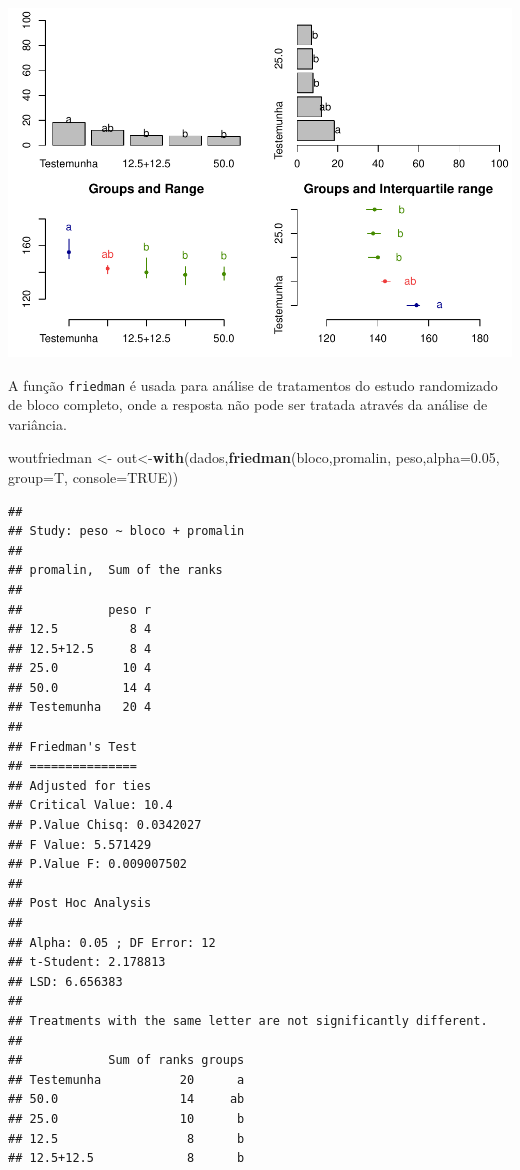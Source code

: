 \documentclass[
]{book}
\newenvironment{Shaded}{\begin{snugshade}}{\end{snugshade}}
\newcommand{\DataTypeTok}[1]{\textcolor[rgb]{0.13,0.29,0.53}{#1}}
\newcommand{\FloatTok}[1]{\textcolor[rgb]{0.00,0.00,0.81}{#1}}
\newcommand{\KeywordTok}[1]{\textcolor[rgb]{0.13,0.29,0.53}{\textbf{#1}}}
\newcommand{\NormalTok}[1]{#1}
\newcommand{\OtherTok}[1]{\textcolor[rgb]{0.56,0.35,0.01}{#1}}
\newcommand{\StringTok}[1]{\textcolor[rgb]{0.31,0.60,0.02}{#1}}
\begin{document}
\includegraphics{TudodoR_files/figure-latex/unnamed-chunk-306-1.pdf}

A função \texttt{friedman} é usada para análise de tratamentos do estudo randomizado
de bloco completo, onde a resposta não pode ser tratada através da análise de variância.

\begin{Shaded}
\begin{Highlighting}[]
\NormalTok{woutfriedman <-}\StringTok{ }\NormalTok{out<-}\KeywordTok{with}\NormalTok{(dados,}\KeywordTok{friedman}\NormalTok{(bloco,promalin, peso,}\DataTypeTok{alpha=}\FloatTok{0.05}\NormalTok{, }\DataTypeTok{group=}\NormalTok{T,}
  \DataTypeTok{console=}\OtherTok{TRUE}\NormalTok{))}
\end{Highlighting}
\end{Shaded}

\begin{verbatim}
## 
## Study: peso ~ bloco + promalin 
## 
## promalin,  Sum of the ranks
## 
##            peso r
## 12.5          8 4
## 12.5+12.5     8 4
## 25.0         10 4
## 50.0         14 4
## Testemunha   20 4
## 
## Friedman's Test
## ===============
## Adjusted for ties
## Critical Value: 10.4
## P.Value Chisq: 0.0342027
## F Value: 5.571429
## P.Value F: 0.009007502 
## 
## Post Hoc Analysis
## 
## Alpha: 0.05 ; DF Error: 12
## t-Student: 2.178813
## LSD: 6.656383 
## 
## Treatments with the same letter are not significantly different.
## 
##            Sum of ranks groups
## Testemunha           20      a
## 50.0                 14     ab
## 25.0                 10      b
## 12.5                  8      b
## 12.5+12.5             8      b
\end{verbatim}
\end{document}
